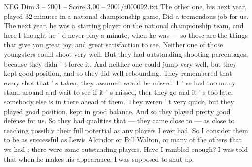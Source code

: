 \begin{textsample}{NEG Dim 3 – 2001 – Score 3.00 – 2001/t000092.txt}
The other one, his next year, played 32 minutes in a national championship game, Did a tremendous job for us.
The next year, he was a starting player on the national championship team, and here I thought he ' d never play a minute, when he was — so those are the things that give you great joy, and great satisfaction to see.
Neither one of those youngsters could shoot very well.
But they had outstanding shooting percentages, because they didn ' t force it.
And neither one could jump very well, but they kept good position, and so they did well rebounding.
They remembered that every shot that ' s taken, they assumed would be missed.
I ' ve had too many stand around and wait to see if it ' s missed, then they go and it ' s too late, somebody else is in there ahead of them.
They weren ' t very quick, but they played good position, kept in good balance.
And so they played pretty good defense for us.
So they had qualities that — they came close to — as close to reaching possibly their full potential as any players I ever had.
So I consider them to be as successful as Lewis Alcindor or Bill Walton, or many of the others that we had ; there were some outstanding players.
Have I rambled enough?
I was told that when he makes his appearance, I was supposed to shut up.

\end{textsample}
